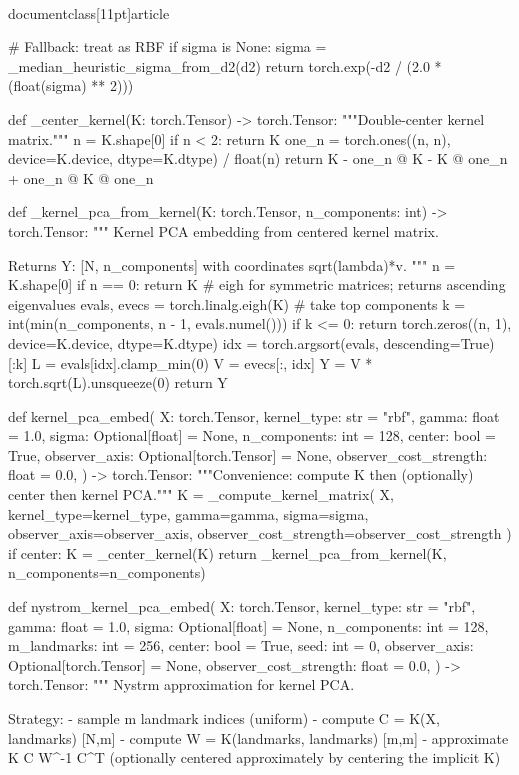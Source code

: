 \\documentclass[11pt]{article}
\begin{document}
\begin{CodeBlock}
    # Fallback: treat as RBF
    if sigma is None:
        sigma = _median_heuristic_sigma_from_d2(d2)
    return torch.exp(-d2 / (2.0 * (float(sigma) ** 2)))


def _center_kernel(K: torch.Tensor) -> torch.Tensor:
    """Double-center kernel matrix."""
    n = K.shape[0]
    if n < 2:
        return K
    one_n = torch.ones((n, n), device=K.device, dtype=K.dtype) / float(n)
    return K - one_n @ K - K @ one_n + one_n @ K @ one_n


def _kernel_pca_from_kernel(K: torch.Tensor, n_components: int) -> torch.Tensor:
    """
    Kernel PCA embedding from centered kernel matrix.

    Returns Y: [N, n_components] with coordinates sqrt(lambda)*v.
    """
    n = K.shape[0]
    if n == 0:
        return K
    # eigh for symmetric matrices; returns ascending eigenvalues
    evals, evecs = torch.linalg.eigh(K)
    # take top components
    k = int(min(n_components, n - 1, evals.numel()))
    if k <= 0:
        return torch.zeros((n, 1), device=K.device, dtype=K.dtype)
    idx = torch.argsort(evals, descending=True)[:k]
    L = evals[idx].clamp_min(0)
    V = evecs[:, idx]
    Y = V * torch.sqrt(L).unsqueeze(0)
    return Y


def kernel_pca_embed(
    X: torch.Tensor,
    kernel_type: str = "rbf",
    gamma: float = 1.0,
    sigma: Optional[float] = None,
    n_components: int = 128,
    center: bool = True,
    observer_axis: Optional[torch.Tensor] = None,
    observer_cost_strength: float = 0.0,
) -> torch.Tensor:
    """Convenience: compute K then (optionally) center then kernel PCA."""
    K = _compute_kernel_matrix(
        X, 
        kernel_type=kernel_type, 
        gamma=gamma, 
        sigma=sigma,
        observer_axis=observer_axis,
        observer_cost_strength=observer_cost_strength
    )
    if center:
        K = _center_kernel(K)
    return _kernel_pca_from_kernel(K, n_components=n_components)


def nystrom_kernel_pca_embed(
    X: torch.Tensor,
    kernel_type: str = "rbf",
    gamma: float = 1.0,
    sigma: Optional[float] = None,
    n_components: int = 128,
    m_landmarks: int = 256,
    center: bool = True,
    seed: int = 0,
    observer_axis: Optional[torch.Tensor] = None,
    observer_cost_strength: float = 0.0,
) -> torch.Tensor:
    """
    Nystrm approximation for kernel PCA.

    Strategy:
      - sample m landmark indices (uniform)
      - compute C = K(X, landmarks) [N,m]
      - compute W = K(landmarks, landmarks) [m,m]
      - approximate K  C W^{-1} C^T (optionally centered approximately by centering the implicit K)


\end{CodeBlock}
\end{document}
